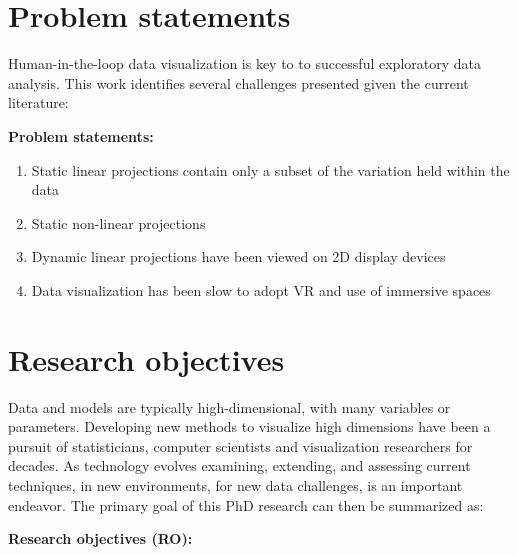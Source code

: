 \documentclass{monashthesis}
\begin{document}
\section{Problem statements}\label{problem-statements}

Human-in-the-loop data visualization is key to to successful exploratory
data analysis. This work identifies several challenges presented given
the current literature:

\textbf{Problem statements:}

\begin{enumerate}
\def\labelenumi{\arabic{enumi}.}
\tightlist
\item
  Static linear projections contain only a subset of the variation held
  within the data
\item
  Static non-linear projections
\item
  Dynamic linear projections have been viewed on 2D display devices
\item
  Data visualization has been slow to adopt VR and use of immersive
  spaces
\end{enumerate}

\section{Research objectives}\label{research-objectives}

Data and models are typically high-dimensional, with many variables or
parameters. Developing new methods to visualize high dimensions have
been a pursuit of statisticians, computer scientists and visualization
researchers for decades. As technology evolves examining, extending, and
assessing current techniques, in new environments, for new data
challenges, is an important endeavor. The primary goal of this PhD
research can then be summarized as:

\textbf{Research objectives (RO):}
\end{document}
